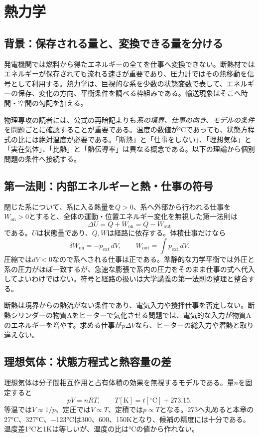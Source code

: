 \chapter{熱力学}
\section{背景：保存される量と、変換できる量を分ける}
発電機関では燃料から得たエネルギーの全てを仕事へ変換できない。断熱材ではエネルギーが保存されても流れる速さが重要であり、圧力計ではその熱移動を信号として利用する。熱力学は、巨視的な系を少数の状態変数で表して、エネルギーの保存、変化の方向、平衡条件を調べる枠組みである。輸送現象はそこへ時間・空間の勾配を加える。

物理専攻の読者には、公式の再暗記よりも\emph{系の境界、仕事の向き、モデルの条件}を問題ごとに確認することが重要である。温度の数値が°Cであっても、状態方程式の比には絶対温度が必要である。「断熱」と「仕事をしない」、「理想気体」と「実在気体」、「比熱」と「熱伝導率」は異なる概念である。以下の理論から個別問題の条件へ接続する。

\section{第一法則：内部エネルギーと熱・仕事の符号}
\label{theory:thermo:firstlaw}
閉じた系について、系に入る熱量を$Q>0$、系へ外部から行われる仕事を$W_{\mathrm{on}}>0$とすると、全体の運動・位置エネルギー変化を無視した第一法則は
\[
 \Delta U=Q+W_{\mathrm{on}}=Q-W_{\mathrm{out}}
\]
である。$U$は状態量であり、$Q,W$は経路に依存する。体積仕事だけなら
\[
 \delta W_{\mathrm{on}}=-p_{\mathrm{ext}}\,dV,
 \qquad W_{\mathrm{out}}=\int p_{\mathrm{ext}}\,dV.
\]
圧縮では$dV<0$なので系へされる仕事は正である。準静的な力学平衡では外圧と系の圧力がほぼ一致するが、急速な膨張で系内の圧力をそのまま仕事の式へ代入してよいわけではない。符号と経路の扱いは大学講義の第一法則の整理と整合する\parencite{mit_thermo_firstlaw2008}。

断熱は境界からの熱流がない条件であり、電気入力や攪拌仕事を否定しない。断熱シリンダーの物質Aをヒーターで気化させる問題では、電気的な入力が物質Aのエネルギーを増やす。求める仕事が$p\Delta V$なら、ヒーターの総入力や潜熱と取り違えない。

\section{理想気体：状態方程式と熱容量の差}
\label{theory:thermo:ideal}
理想気体は分子間相互作用と占有体積の効果を無視するモデルである。量$n$を固定すると
\[
 pV=nRT,
 \qquad T[\mathrm{K}]=t[{}^\circ\mathrm{C}]+273.15.
\]
等温では$V\propto1/p$、定圧では$V\propto T$、定積では$p\propto T$となる。273へ丸めると本章の27°C、327°C、−123°Cは300、600、150Kとなり、候補の精度には十分である。温度差1°Cと1Kは等しいが、温度の比は°Cの値から作れない。

